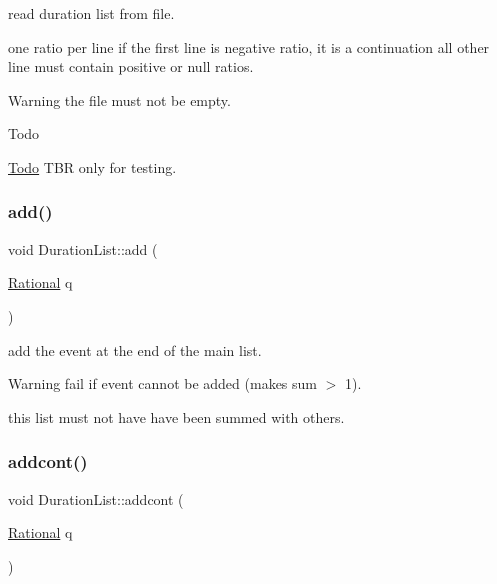 read duration list from file. 

one ratio per line if the first line is negative ratio, it is a continuation all other line must contain positive or null ratios. \begin{DoxyWarning}{Warning}
the file must not be empty.
\end{DoxyWarning}
\begin{DoxyRefDesc}{Todo}
\item[\mbox{\hyperlink{todo__todo000011}{Todo}}]T\+BR only for testing. \end{DoxyRefDesc}
\mbox{\label{group__output_gaddb48455388f36f48ace0f0c0b250105}} 
\subsubsection{\texorpdfstring{add()}{add()}\hspace{0.1cm}{\footnotesize\ttfamily [1/2]}}
{\footnotesize\ttfamily void Duration\+List\+::add (\begin{DoxyParamCaption}\item[{\mbox{\hyperlink{classRational}{Rational}}}]{q }\end{DoxyParamCaption})}



add the event at the end of the main list. 

\begin{DoxyWarning}{Warning}
fail if event cannot be added (makes sum $>$ 1). 

this list must not have have been summed with others. 
\end{DoxyWarning}
\mbox{\label{group__output_gab9d508060073c83c27e13f8f2472de38}} 
\subsubsection{\texorpdfstring{addcont()}{addcont()}}
{\footnotesize\ttfamily void Duration\+List\+::addcont (\begin{DoxyParamCaption}\item[{\mbox{\hyperlink{classRational}{Rational}}}]{q }\end{DoxyParamCaption})}



